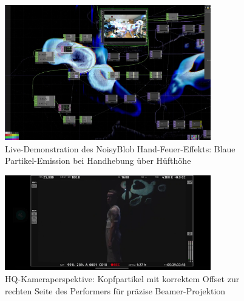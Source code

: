 \begin{figure}[htbp]
    \centering
    \includegraphics[width=0.8\textwidth,height=0.4\textheight,keepaspectratio]{images/DemonstrationOfTheMagicalFireHands.png}
    \caption{Live-Demonstration des NoisyBlob Hand-Feuer-Effekts: Blaue Partikel-Emission bei Handhebung über Hüfthöhe}
    \label{fig:handfeuer_demonstration}
\end{figure}


\begin{figure}[htbp]
    \centering
    \includegraphics[width=0.8\textwidth,height=0.4\textheight,keepaspectratio]{images/HQCameraHeadtrackingVisibleWithBubblesOffsetCorrectlyFromHQCameraViewToAppearOnRightSideOfHead.png}
    \caption{HQ-Kameraperspektive: Kopfpartikel mit korrektem Offset zur rechten Seite des Performers für präzise Beamer-Projektion}
    \label{fig:headtracking_hq_kamera_offset}
\end{figure}

